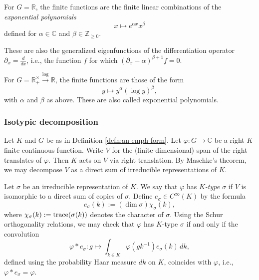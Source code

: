 \documentclass[reqno]{amsart} 
\begin{document}
\begin{example}
  For $G = \mathbb{R}$, the finite functions are the finite linear combinations of the \emph{exponential polynomials}
  \begin{equation*}
    x \mapsto e^{\alpha x} x^{\beta}
  \end{equation*}
  defined for $\alpha \in \mathbb{C}$ and $\beta \in \mathbb{Z}_{\geq 0}$.

  These are also the generalized eigenfunctions of the differentiation operator $\partial_x = \frac{d}{d x}$, i.e., the function $f$ for which $(\partial_x - \alpha )^{\beta+1} f = 0$.
\end{example}
\begin{example}\label{exa:g-=-mathbbrtimes_+}
  For $G = \mathbb{R}^\times_+ \xrightarrow{\log} \mathbb{R}$, the finite functions are those of the form
  \begin{equation*}
    y \mapsto y^{\alpha} (\log y)^{\beta},
  \end{equation*}
  with $\alpha$ and $\beta$ as above.  These are also called exponential polynomials.
\end{example}

\subsubsection{Isotypic decomposition}\label{sec:isotyp-decomp}
Let $K$ and $G$ be as in Definition \ref{defn:an-emph-form}.  Let $\varphi : G \rightarrow \mathbb{C}$ be a right $K$-finite continuous function.  Write $V$ for the (finite-dimensional) span of the right translates of $\varphi$.  Then $K$ acts on $V$ via right translation.  By Maschke's theorem, we may decompose $V$ as a direct sum of irreducible representations of $K$.

Let $\sigma$ be an irreducible representation of $K$.  We say that $\varphi$ has \emph{$K$-type $\sigma$} if $V$ is isomorphic to a direct sum of copies of $\sigma$. Define $e_\sigma \in C^\infty(K)$ by the formula
\begin{equation*}
  e_\sigma(k) := (\dim \sigma) \chi_\sigma(k),
\end{equation*}
where $\chi_\sigma(k) := \operatorname{trace}(\sigma(k))$ denotes the character of $\sigma$.  Using the Schur orthogonality relations, we may check that $\varphi$ has $K$-type $\sigma$ if and only if the convolution
\begin{equation*}
  \varphi \ast e_\sigma : g \mapsto \int_{k \in K} \varphi(g k^{-1}) e_\sigma(k) \, d k,
\end{equation*}
defined using the probability Haar measure $d k$ on $K$, coincides with $\varphi$, i.e., $\varphi \ast e _\sigma = \varphi$.
\end{document}
